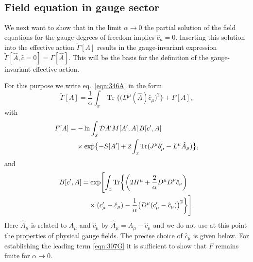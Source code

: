 \documentclass[twocolumn,aps,prd,amsmath,amssymb,preprintnumbers,longbibliography]{revtex4-1}
\numberwithin{equation}{section}
\DeclareMathOperator{\Tr}{Tr}
\newenvironment{alignedeqn}{\begin{equation}\begin{aligned}}{\end{aligned}\end{equation}\ignorespacesafterend}
\begin{document}
\subsection{Field equation in gauge sector}

We next want to show that in the limit $\alpha \to 0$ the partial solution of the field equations for the gauge degrees of freedom implies $\hat{c}_\mu = 0$. Inserting this solution into the effective action $\tilde\Gamma[A]$ results in the gauge-invariant expression $\tilde\Gamma[\hat{A},\hat{c} = 0] = \bar\Gamma[\hat{A}]$. This will be the basis for the definition of the gauge-invariant effective action.

For this purpose we write eq.~\eqref{eqn:346A} in the form
\begin{equation}\label{eqn:346C}
	\tilde\Gamma[A]
	= \frac{1}{\alpha} \int_x \Tr\bigl\{\bigl(D^\mu(\hat{A})\hat{c}_\mu\bigr)^2\bigr\} + F[A],
\end{equation}
with
\begin{alignedeqn}\label{eqn:346D}
	F[A]
	&= -\ln\int_x \mathcal{D} A^\prime M[A^\prime,A] \, B[c^\prime,A]\\
	&\hphantom{{}=}\times \exp \bigl\{-S[A^\prime] + 2 \int_x \Tr(J^\mu b^\prime_\mu - L^\mu\hat{A}_\mu)\bigr\},
\end{alignedeqn}
and
\begin{alignedeqn}\label{eqn:346E}
	B[c^\prime,A]
	&= \exp\Biggl[\int_x \Tr\biggl\{\left(2H^\mu + \frac{2}{\alpha} D^\mu D^\nu\hat{c}_\nu\right)\\
	&\hphantom{{}=}\times (c^\prime_\mu - \hat{c}_\mu)
	- \frac{1}{\alpha} \bigl(D^\mu(c^\prime_\mu - \hat{c}_\mu)\bigr)^2\biggr\}\Biggr].
\end{alignedeqn}
Here $\hat{A}_\mu$ is related to $A_\mu$ and $\hat{c}_\mu$ by $\hat{A}_\mu = A_\mu - \hat{c}_\mu$ and we do not use at this point the properties of physical gauge fields. The precise choice of $\hat{c}_\mu$ is given below. For establishing the leading term \eqref{eqn:307G} it is sufficient to show that $F$ remains finite for $\alpha \to 0$.
\end{document}
